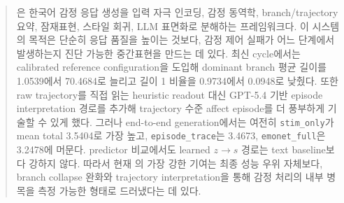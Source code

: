 \begin{abstract}
\EmoNet{}은 한국어 감정 응답 생성을 입력 자극 인코딩, 감정 동역학, branch/trajectory 요약, 잠재표현, 스타일 회귀, LLM 표면화로 분해하는 프레임워크다. 이 시스템의 목적은 단순히 응답 품질을 높이는 것보다, 감정 제어 실패가 어느 단계에서 발생하는지 진단 가능한 중간표현을 만드는 데 있다. 최신 cycle에서는 calibrated reference configuration을 도입해 dominant branch 평균 길이를 1.0539에서 70.4684로 늘리고 길이 1 비율을 0.9734에서 0.0948로 낮췄다. 또한 raw trajectory를 직접 읽는 heuristic readout 대신 GPT-5.4 기반 episode interpretation 경로를 추가해 trajectory 수준 affect episode를 더 풍부하게 기술할 수 있게 했다. 그러나 end-to-end generation에서는 여전히 \texttt{stim\_only}가 mean total 3.5404로 가장 높고, \texttt{episode\_trace}는 3.4673, \texttt{emonet\_full}은 3.2478에 머문다. predictor 비교에서도 learned $z \rightarrow s$ 경로는 text baseline보다 강하지 않다. 따라서 현재 \EmoNet{}의 가장 강한 기여는 최종 성능 우위 자체보다, branch collapse 완화와 trajectory interpretation을 통해 감정 처리의 내부 병목을 측정 가능한 형태로 드러냈다는 데 있다.
\end{abstract}
